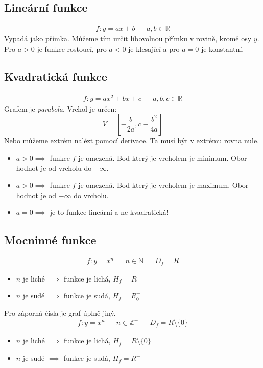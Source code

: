 \documentclass[12pt]{article}
\newcommand{\nR}{\mathbb{R}} %
\newcommand{\nN}{\mathbb{N}} %
\newcommand{\nZ}{\mathbb{Z}} %
\begin{document}
\subsection{Lineární funkce}
\begin{align}
f: y = ax + b && a,b \in \nR
\end{align}
Vypadá jako přímka. Můžeme tím určit libovolnou přímku v rovině, kromě osy $y$. Pro $a>0$ je funkce rostoucí, pro $a<0$ je klesající a pro $a=0$ je konstantní.
\subsection{Kvadratická funkce}
\begin{align}
f: y = ax^2 + bx +c && a,b,c \in \nR
\end{align}
Grafem je \emph{parabola}. Vrchol je určen:
\begin{equation}
V  = \left[ -\frac{b}{2a} , c- \frac{b^2}{4a} \right]
\end{equation}
Nebo můžeme extrém nalézt pomocí derivace. Ta musí být v extrému rovna nule.
\begin{itemize}
\item $a>0 \implies$ funkce $f$ je omezená. Bod který je vrcholem je minimum. Obor hodnot je od vrcholu do $+ \infty$.
\item $a>0 \implies$ funkce $f$ je omezená. Bod který je vrcholem je maximum. Obor hodnot je od $- \infty$ do vrcholu.
\item $a=0 \implies$  je to funkce lineární a ne kvadratická!
\end{itemize}
\subsection{Mocninné funkce}
\begin{align}
f: y = x^n && n \in \nN && D_f = R
\end{align}
\begin{itemize}
\item $n$ je liché $\implies$ funkce je lichá, $H_f = R$
\item $n$ je sudé $\implies$ funkce je sudá, $H_f = R_0^+$
\end{itemize}
Pro záporná čísla je graf úplně jiný.
\begin{align}
f: y = x^n && n \in \nZ^- && D_f = R \setminus \{ 0 \}
\end{align}
\begin{itemize}
\item $n$ je liché $\implies$ funkce je lichá, $H_f = R  \setminus \{ 0 \}$
\item $n$ je sudé $\implies$ funkce je sudá, $H_f = R^+$
\end{itemize}
\end{document}
